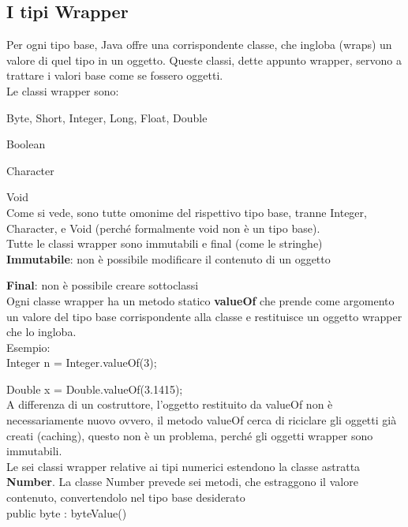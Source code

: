 \documentclass[10pt]{article}
\begin{document}
\subsection{I tipi Wrapper}
Per ogni tipo base, Java offre una corrispondente classe, che ingloba (wraps) un  valore di quel tipo in un oggetto.
Queste classi, dette appunto wrapper, servono a trattare i valori base come se  fossero oggetti.\\
Le classi wrapper sono:

Byte, Short, Integer, Long, Float, Double

Boolean

Character

Void\\

Come si vede, sono tutte omonime del rispettivo tipo base, tranne Integer, Character, 
e Void (perché formalmente void non è un tipo base).\\

Tutte le classi wrapper sono immutabili e final (come le stringhe)\\

\textbf{Immutabile}: non è possibile modificare il contenuto di un oggetto

\textbf{Final}: non è possibile creare sottoclassi\\

Ogni classe wrapper ha un metodo statico \textbf{valueOf} che prende come argomento un valore 
del tipo base corrispondente alla classe e restituisce un oggetto wrapper che lo ingloba.\\

Esempio:\\

Integer n = Integer.valueOf(3);

Double x = Double.valueOf(3.1415);\\

A differenza di un costruttore, l'oggetto restituito da valueOf non è necessariamente nuovo ovvero, il metodo valueOf cerca di riciclare gli oggetti già creati (caching), questo non è un problema, perché gli oggetti wrapper sono immutabili.\\

Le sei classi wrapper relative ai tipi numerici estendono la classe astratta \textbf{Number}.
La classe Number prevede sei metodi, che estraggono il valore contenuto, convertendolo nel tipo base desiderato\\

public byte : byteValue()
\end{document}
